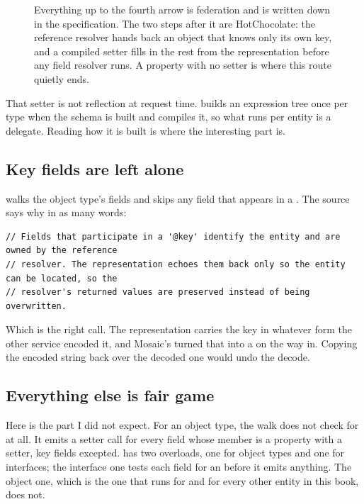 \begin{figure}[htbp]
  \centering
  
  \caption{Everything up to the fourth arrow is federation and is written down
  in the specification. The two steps after it are HotChocolate: the reference
  resolver hands back an object that knows only its own key, and a compiled
  setter fills in the rest from the representation before any field resolver
  runs. A property with no setter is where this route quietly ends.}
  \label{fig:ch11-required-field-route}
\end{figure}

%
That setter is not reflection at request time. 
builds an expression tree once per type when the schema is built and compiles
it, so what runs per entity is a delegate. Reading how it is built is where the
interesting part is.

\subsection*{Key fields are left alone}

 walks the object type's fields and skips any field that
appears in a . The source says why in as many words:

\begin{verbatim}
// Fields that participate in a '@key' identify the entity and are owned by the reference
// resolver. The representation echoes them back only so the entity can be located, so the
// resolver's returned values are preserved instead of being overwritten.
\end{verbatim}

Which is the right call. The representation carries the key in whatever form
the other service encoded it, and Mosaic's  turned
that into a  on the way in. Copying the encoded string back over the
decoded one would undo the decode.

\subsection*{Everything else is fair game}

%
Here is the part I did not expect. For an object type, the walk does not check
for  at all. It emits a setter call for every field whose
member is a property with a setter, key fields excepted.
 has two overloads, one for object types and one for
interfaces; the interface one tests each field for an 
before it emits anything. The object one, which is the one that runs for
 and for every other entity in this book, does not.

